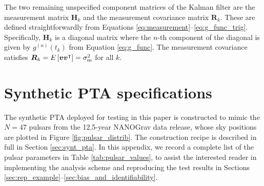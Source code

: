 \documentclass[fleqn,usenatbib,useAMS]{mnras}
\begin{document}
The two remaining unspecified component matrices of the Kalman filter are the measurement matrix $\boldsymbol{H}_k$ and the measurement covariance matrix $\boldsymbol{R}_k$. These are defined straightforwardly from Equations \eqref{eq:measurement}--\eqref{eq:g_func_trig}. Specifically, 
$\boldsymbol{H}_k$ is a diagonal matrix where the $n$-th component of the diagonal is given by $g^{(n)}(t_k)$ from Equation \eqref{eq:g_func}. The measurement covariance satisfies $\boldsymbol{R}_k = E \left[ \boldsymbol{v} \boldsymbol{v}^\intercal \right] = \sigma^2_{\rm m}$ for all $k$.



\section{Synthetic PTA specifications}\label{appendix_fiducial}
The synthetic PTA deployed for testing in this paper is constructed to mimic the $N=47$ pulsars from the 12.5-year NANOGrav data release, whose sky positions are plotted in Figure \ref{fig:pulsar_distrib}. The construction recipe is described in full in Section \ref{sec:synt_pta}. In this appendix, we record a complete list of the pulsar parameters in Table \ref{tab:pulsar_values}, to assist the interested reader in implementing the analysis scheme and reproducing the test results in Sections \ref{sec:rep_example}--\ref{sec:bias_and_identifiability}.
\end{document}
